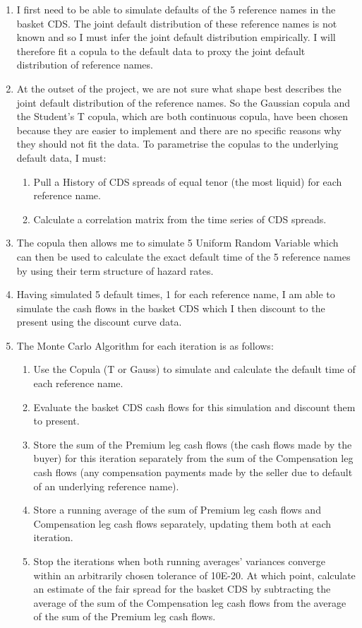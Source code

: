 \documentclass{report}
\theoremstyle{plain}
\theoremstyle{definition}
\begin{document}
\begin{enumerate}
\item I first need to be able to simulate defaults of the 5 reference names in the basket CDS. The joint default distribution of these reference names is not known and so I must infer the joint default distribution empirically. I will therefore fit a copula to the default data to proxy the joint default distribution of reference names.
\item At the outset of the project, we are not sure what shape best describes the joint default distribution of the reference names. So the Gaussian copula and the Student's T copula, which are both continuous copula, have been chosen because they are easier to implement and there are no specific reasons why they should not fit the data. To parametrise the copulas to the underlying default data, I must: 
	\begin{enumerate}
		\item Pull a History of CDS spreads of equal tenor (the most liquid) for each reference name.
		\item Calculate a correlation matrix from the time series of CDS spreads.
	\end{enumerate}
\item The copula then allows me to simulate 5 Uniform Random Variable which can then be used to calculate the exact default time of the 5 reference names by using their term structure of hazard rates.
\item Having simulated 5 default times, 1 for each reference name, I am able to simulate the cash flows in the basket CDS which I then discount to the present using the discount curve data.
\item The Monte Carlo Algorithm for each iteration is as follows: 
	\begin{enumerate}
		\item Use the Copula (T or Gauss) to simulate and calculate the default time of each reference name.
		\item Evaluate the basket CDS cash flows for this simulation and discount them to present. 
		\item Store the sum of the Premium leg cash flows (the cash flows made by the buyer) for this iteration separately from the sum of the Compensation leg cash flows (any compensation payments made by the seller due to default of an underlying reference name).
		\item Store a running average of the sum of Premium leg cash flows and Compensation leg cash flows separately, updating them both at each iteration.
		\item Stop the iterations when both running averages' variances converge within an arbitrarily chosen tolerance of 10E-20. At which point, calculate an estimate of the fair spread for the basket CDS by subtracting the average of the sum of the Compensation leg cash flows from the average of the sum of the Premium leg cash flows.
	\end{enumerate}
\end{enumerate}
\end{document}
